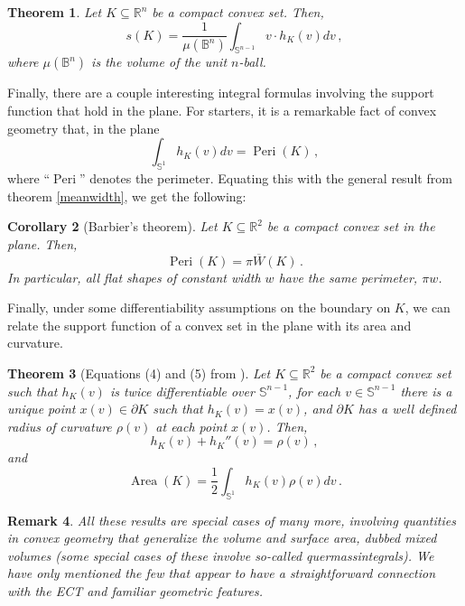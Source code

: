 \documentclass[a4paper]{article}
\newtheorem{theorem}{Theorem}[section]
\newtheorem{coro}[theorem]{Corollary}
\newtheorem{remark}[theorem]{Remark}
\newcommand{\bb}{\mathbb}
\newcommand{\Peri}{\operatorname{Peri}}
\begin{document}
\begin{theorem}
	\label{SteinerIntegralFormula}
		Let $K\subseteq \bb R^n$ be a compact convex set. Then,
		\[ s(K)=\frac{1}{\mu(\bb B^{n})}\int_{\bb S^{n-1}} v \cdot h_K(v) dv\, , \]
		where $\mu(\bb B^{n})$ is the volume of the unit $n$-ball.
\end{theorem}

Finally, there are a couple interesting integral formulas involving the support function that hold in the plane. For starters, it is a remarkable fact of convex geometry that, in the plane
\begin{equation}
	\label{PeriSupport}
\int_{\bb S^{1}} h_K(v) dv =\Peri(K)\, ,
\end{equation}
where ``$\Peri$'' denotes the perimeter. Equating this with the general result from theorem \ref{meanwidth}, we get the following:

\begin{coro}[Barbier's theorem]
	\label{Barbier}
	Let $K\subseteq \bb R^2$ be a compact convex set in the plane. Then,
	\[ \Peri(K)=\pi \overline W(K)\, . \]
	In particular, all flat shapes of constant width $w$ have the same perimeter, $\pi w$.
\end{coro}

Finally, under some differentiability assumptions on the boundary on $K$, we can relate the support function of a convex set in the plane with its area and curvature.

\begin{theorem}[Equations (4) and (5) from \cite{malagoli2009optimal}]
	\label{SupportArea}
	Let $K\subseteq \bb R^2$ be a compact convex set such that $h_K(v)$ is twice differentiable over $\bb S^{n-1}$, for each $v \in \bb S^{n-1}$ there is a unique point $x(v) \in \partial K$ such that $h_K(v)=x(v)$, and $\partial K$ has a well defined radius of curvature $\rho(v)$ at each point $x(v)$. Then,
	\[ h_K(v)+h_K''(v)=\rho(v)\, , \]
	and
	\[ \operatorname{Area}(K)=\frac{1}{2}\int_{\bb S^1} h_K(v) \rho(v) dv\, .\]
\end{theorem}

\begin{remark}
	All these results are special cases of many more, involving quantities in convex geometry that generalize the volume and surface area, dubbed \emph{mixed volumes} (some special cases of these involve so-called \emph{quermassintegrals}). We have only mentioned the few that appear to have a straightforward connection with the ECT and familiar geometric features.
\end{remark}
\end{document}
